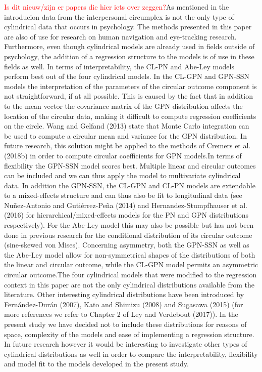 \documentclass[man]{apa6}
\theoremstyle{definition}
\theoremstyle{definition}
\theoremstyle{definition}
\theoremstyle{remark}
\begin{document}
\textcolor{red}{Is dit nieuw/zijn er papers die hier iets over
zeggen?}\newline \indent As mentioned in the introducion data from the
interpersonal circumplex is not the only type of cylindrical data that
occurs in psychology. The methods presented in this paper are also of
use for research on human navigation and eye-tracking research.
Furthermore, even though cylindrical models are already used in fields
outside of psychology, the addition of a regression structure to the
models is of use in these fields as well. \newline \indent In terms of
interpretability, the CL-PN and Abe-Ley models perform best out of the
four cylindrical models. In the CL-GPN and GPN-SSN models the
interpretation of the parameters of the circular outcome component is
not straightforward, if at all possible. This is caused by the fact that
in addition to the mean vector the covariance matrix of the GPN
distribution affects the location of the circular data, making it
difficult to compute regression coefficients on the circle. Wang and
Gelfand (2013) state that Monte Carlo integration can be used to compute
a circular mean and variance for the GPN distribution. In future
research, this solution might be applied to the methods of Cremers et
al. (2018b) in order to compute circular coefficients for GPN
models.\newline \indent In terms of flexibility the GPN-SSN model scores
best. Multiple linear and circular outcomes can be included and we can
thus apply the model to multivariate cylindrical data. In addition the
GPN-SSN, the CL-GPN and CL-PN models are extendable to a mixed-effects
structure and can thus also be fit to longitudinal data (see
Nuñez-Antonio and Gutiérrez-Peña (2014) and Hernandez-Stumpfhauser et
al. (2016) for hierarchical/mixed-effects models for the PN and GPN
distributions respectively). For the Abe-Ley model this may also be
possible but has not been done in previous research for the conditional
distribution of its circular outcome (sine-skewed von Mises). Concerning
asymmetry, both the GPN-SSN as well as the Abe-Ley model allow for
non-symmetrical shapes of the distributions of both the linear and
circular outcome, while the CL-GPN model permits an asymmetric circular
outcome.\newline \indent The four cylindrical models that were modified
to the regression context in this paper are not the only cylindrical
distributions available from the literature. Other interesting
cylindrical distributions have been introduced by Fernández-Durán
(2007), Kato and Shimizu (2008) and Sugasawa (2015) (for more references
we refer to Chapter 2 of Ley and Verdebout (2017)). In the present study
we have decided not to include these distributions for reasons of space,
complexity of the models and ease of implementing a regression
structure. In future research however it would be interesting to
investigate other types of cylindrical distributions as well in order to
compare the interpretability, flexibility and model fit to the models
developed in the present study.\newline
\end{document}
